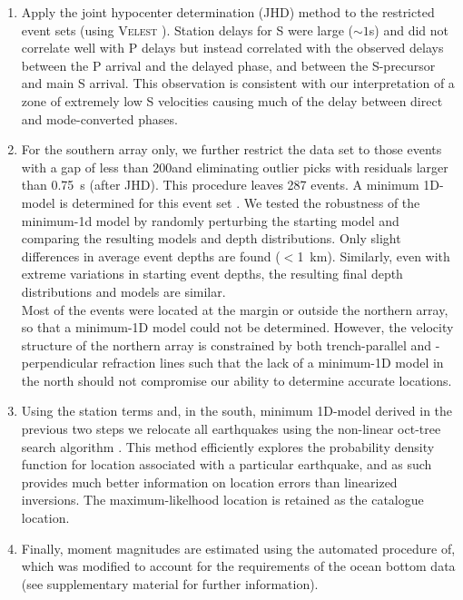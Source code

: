 \documentclass[reviewcopy]{elsarticle}
\begin{document}
\begin{enumerate}
\item Apply the joint
  hypocenter determination (JHD) method to the restricted event sets (using
  \textsc{Velest} \citep{kissling94}).  Station delays for S were large ($\sim 1$s) and did
  not correlate well with P delays but instead correlated with
  the observed delays between the P arrival and the delayed phase, and
between the S-precursor and main S arrival.  This observation is consistent
  with our interpretation of a zone of extremely low S velocities
  causing much of the delay between direct and mode-converted phases.
\item For the southern array only, we further restrict the data set to
  those events with a gap of less than 200\dg and eliminating outlier
  picks
  with residuals larger than 0.75~s (after JHD).
%
  This procedure leaves 287 events. A minimum 1D-model is determined
  for this event set \citep{kissling94}.  We tested the robustness of the minimum-1d
  model by randomly perturbing the starting model and comparing the resulting models and depth distributions.
  Only slight differences in average event depths are found
  ($<$1~km). Similarly, even with extreme variations in starting event
  depths,
 the resulting final depth distributions and models are
  similar. \\
  Most of the events were located at the margin or outside the
  northern array, so that a minimum-1D model could not be determined.
  However, the velocity structure of the northern array is
  constrained by both trench-parallel and -perpendicular refraction
  lines \citep{scherwath06}
such
  that the lack of a minimum-1D model in the north should not
  compromise our ability to determine accurate
  locations. 
\item Using the station terms and, in the south, minimum 1D-model
  derived in the previous two steps we relocate all earthquakes using
  the non-linear oct-tree search algorithm \citep{lomax00}.  This method efficiently
  explores the probability density function for location associated
  with a particular earthquake, and as such provides much better
  information on location errors than linearized inversions.  The
  maximum-likelhood location is retained as the catalogue location.
\item
Finally, moment magnitudes are estimated using the automated procedure
of\citet{ottemoeller03}, which was modified to account for the
requirements of the ocean bottom data (see supplementary material for
further information).
\end{enumerate}
\end{document}
